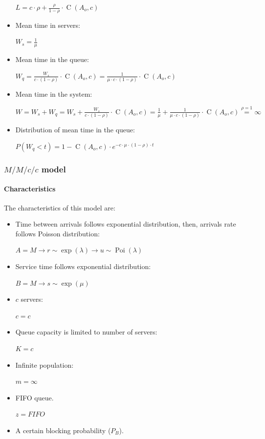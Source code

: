 \documentclass[../main.tex]{subfiles}
\begin{document}
\begin{itemize}
{		$
			L = c \cdot \rho + \frac {\rho} {1-\rho} \cdot \operatorname{C}(A_o, c)
		$
	}
	\item {
		Mean time in servers:

		$
			W_s = \frac {1} {\mu}
		$
	}
	\item {
		Mean time in the queue:

		$
			W_q =
			\frac {W_s} {c \cdot (1-\rho)} \cdot \operatorname{C}(A_o, c) =
			\frac {1} {\mu \cdot c \cdot (1-\rho)} \cdot \operatorname{C}(A_o, c)
		$
	}
	\item {
		Mean time in the system:

		$
			W =
			W_s + W_q =
			W_s + \frac {W_s} {c \cdot (1-\rho)} \cdot \operatorname{C}(A_o, c) =
			\frac {1} {\mu} + \frac {1} {\mu \cdot c \cdot (1-\rho)} \cdot \operatorname{C}(A_o, c)
			\overset {\rho=1} {=} \infty
		$
	}
	\item {
		Distribution of mean time in the queue:

		$
			P(W_q < t) = 1 - \operatorname{C}(A_o, c) \cdot e^{- c \cdot \mu \cdot (1-\rho) \cdot t}
		$
	}
\end{itemize}

\subsubsection{$M/M/c/c$ model}

\paragraph{Characteristics}

The characteristics of this model are:

\begin{itemize}
	\item {
		Time between arrivals follows exponential distribution, then, arrivals rate follows Poisson distribution:

		$
			A = M \rightarrow r \sim \operatorname{exp} (\lambda) \rightarrow u \sim \operatorname{Poi} (\lambda)
		$
	}
	\item {
		Service time follows exponential distribution:

		$
			B = M \rightarrow s \sim \operatorname{exp} (\mu)
		$
	}
	\item {
		$c$ servers:

		$
			c = c
		$
	}
	\item {
		Queue capacity is limited to number of servers:

		$
			K = c
		$
	}
	\item {
		Infinite population:

		$
			m = \infty
		$
	}
	\item {
		FIFO queue.

		$
			z = FIFO
		$
	}
	\item A certain blocking probability ($P_B$).
\end{itemize}
\end{document}

